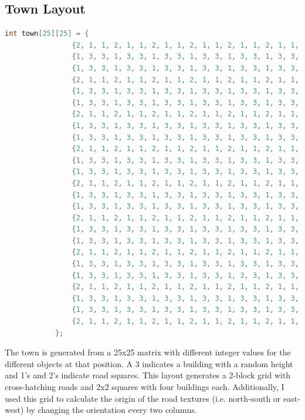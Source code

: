 \documentclass[journal,10pt,onecolumn,compsoc]{IEEEtran}
\begin{document}
\subsection{Town Layout}
\tiny
\begin{lstlisting}[language=C++]
            int town[25][25] = {
                {2, 1, 1, 2, 1, 1, 2, 1, 1, 2, 1, 1, 2, 1, 1, 2, 1, 1, 2, 1, 1, 2, 1, 1, 2},//1
                {1, 3, 3, 1, 3, 3, 1, 3, 3, 1, 3, 3, 1, 3, 3, 1, 3, 3, 1, 3, 3, 1, 3, 3, 1},//2
                {1, 3, 3, 1, 3, 3, 1, 3, 3, 1, 3, 3, 1, 3, 3, 1, 3, 3, 1, 3, 3, 1, 3, 3, 1},//3
                {2, 1, 1, 2, 1, 1, 2, 1, 1, 2, 1, 1, 2, 1, 1, 2, 1, 1, 2, 1, 1, 2, 1, 1, 2},//4
                {1, 3, 3, 1, 3, 3, 1, 3, 3, 1, 3, 3, 1, 3, 3, 1, 3, 3, 1, 3, 3, 1, 3, 3, 1},//5
                {1, 3, 3, 1, 3, 3, 1, 3, 3, 1, 3, 3, 1, 3, 3, 1, 3, 3, 1, 3, 3, 1, 3, 3, 1},//6
                {2, 1, 1, 2, 1, 1, 2, 1, 1, 2, 1, 1, 2, 1, 1, 2, 1, 1, 2, 1, 1, 2, 1, 1, 2},//7
                {1, 3, 3, 1, 3, 3, 1, 3, 3, 1, 3, 3, 1, 3, 3, 1, 3, 3, 1, 3, 3, 1, 3, 3, 1},//8
                {1, 3, 3, 1, 3, 3, 1, 3, 3, 1, 3, 3, 1, 3, 3, 1, 3, 3, 1, 3, 3, 1, 3, 3, 1},//9
                {2, 1, 1, 2, 1, 1, 2, 1, 1, 2, 1, 1, 2, 1, 1, 2, 1, 1, 2, 1, 1, 2, 1, 1, 2},//10
                {1, 3, 3, 1, 3, 3, 1, 3, 3, 1, 3, 3, 1, 3, 3, 1, 3, 3, 1, 3, 3, 1, 3, 3, 1},//11
                {1, 3, 3, 1, 3, 3, 1, 3, 3, 1, 3, 3, 1, 3, 3, 1, 3, 3, 1, 3, 3, 1, 3, 3, 1},//12
                {2, 1, 1, 2, 1, 1, 2, 1, 1, 2, 1, 1, 2, 1, 1, 2, 1, 1, 2, 1, 1, 2, 1, 1, 2},//13
                {1, 3, 3, 1, 3, 3, 1, 3, 3, 1, 3, 3, 1, 3, 3, 1, 3, 3, 1, 3, 3, 1, 3, 3, 1},//14
                {1, 3, 3, 1, 3, 3, 1, 3, 3, 1, 3, 3, 1, 3, 3, 1, 3, 3, 1, 3, 3, 1, 3, 3, 1},//15
                {2, 1, 1, 2, 1, 1, 2, 1, 1, 2, 1, 1, 2, 1, 1, 2, 1, 1, 2, 1, 1, 2, 1, 1, 2},//16
                {1, 3, 3, 1, 3, 3, 1, 3, 3, 1, 3, 3, 1, 3, 3, 1, 3, 3, 1, 3, 3, 1, 3, 3, 1},//17
                {1, 3, 3, 1, 3, 3, 1, 3, 3, 1, 3, 3, 1, 3, 3, 1, 3, 3, 1, 3, 3, 1, 3, 3, 1},//18
                {2, 1, 1, 2, 1, 1, 2, 1, 1, 2, 1, 1, 2, 1, 1, 2, 1, 1, 2, 1, 1, 2, 1, 1, 2},//19
                {1, 3, 3, 1, 3, 3, 1, 3, 3, 1, 3, 3, 1, 3, 3, 1, 3, 3, 1, 3, 3, 1, 3, 3, 1},//20
                {1, 3, 3, 1, 3, 3, 1, 3, 3, 1, 3, 3, 1, 3, 3, 1, 3, 3, 1, 3, 3, 1, 3, 3, 1},//21
                {2, 1, 1, 2, 1, 1, 2, 1, 1, 2, 1, 1, 2, 1, 1, 2, 1, 1, 2, 1, 1, 2, 1, 1, 2},//22
                {1, 3, 3, 1, 3, 3, 1, 3, 3, 1, 3, 3, 1, 3, 3, 1, 3, 3, 1, 3, 3, 1, 3, 3, 1},//23
                {1, 3, 3, 1, 3, 3, 1, 3, 3, 1, 3, 3, 1, 3, 3, 1, 3, 3, 1, 3, 3, 1, 3, 3, 1},//24
                {2, 1, 1, 2, 1, 1, 2, 1, 1, 2, 1, 1, 2, 1, 1, 2, 1, 1, 2, 1, 1, 2, 1, 1, 2}//25
            };
\end{lstlisting}
\normalsize
The town is generated from a 25x25 matrix with different integer values for the different objects at that position. A 3 indicates a building with a random height and 1's and 2's indicate road squares. This layout generates a 2-block grid with cross-hatching roads and 2x2 squares with four buildings each. Additionally, I used this grid to calculate the origin of the road textures (i.e. north-south or east-west) by changing the orientation every two columns. 
\end{document}
